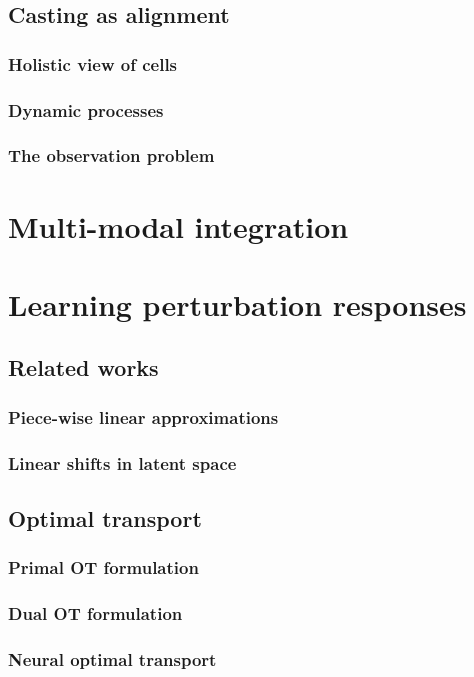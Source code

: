 \section{Casting as alignment}
\subsection{Holistic view of cells}
\subsection{Dynamic processes}
\subsection{The observation problem}

\chapter{Multi-modal integration}

\chapter{Learning perturbation responses}
\section{Related works}
\subsection{Piece-wise linear approximations}
\subsection{Linear shifts in latent space}

\section{Optimal transport}
\subsection{Primal OT formulation}
\subsection{Dual OT formulation}
\subsection{Neural optimal transport}
